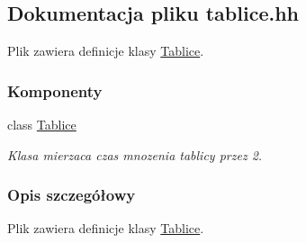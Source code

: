 \hypertarget{tablice_8hh}{\subsection{Dokumentacja pliku tablice.\-hh}
\label{tablice_8hh}
}


Plik zawiera definicje klasy \hyperlink{class_tablice}{Tablice}.  


\subsubsection*{Komponenty}
\begin{DoxyCompactItemize}
\item 
class \hyperlink{class_tablice}{Tablice}
\begin{DoxyCompactList}\small\item\em Klasa mierzaca czas mnozenia tablicy przez 2. \end{DoxyCompactList}\end{DoxyCompactItemize}


\subsubsection{Opis szczegółowy}
Plik zawiera definicje klasy \hyperlink{class_tablice}{Tablice}. 